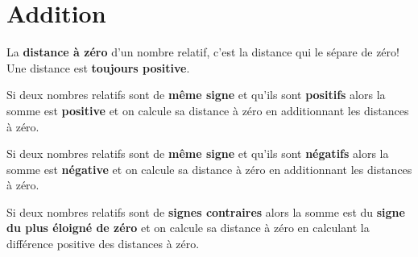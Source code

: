 \section{Addition}

\begin{definition}
    La \textbf{distance à zéro} d'un nombre relatif, c'est la distance qui le sépare de zéro!\\
    Une distance est \textbf{toujours positive}.
\end{definition}

\begin{propriete}
    Si deux nombres relatifs sont de \textbf{même signe} et qu'ils sont \textbf{positifs} alors la somme est \textbf{positive} et on calcule sa distance à zéro en additionnant les distances à zéro.
\end{propriete}

\begin{propriete}
    Si deux nombres relatifs sont de \textbf{même signe} et qu'ils sont \textbf{négatifs} alors la somme est \textbf{négative} et on calcule sa distance à zéro en additionnant les distances à zéro.
\end{propriete}

\begin{propriete}
    Si deux nombres relatifs sont de \textbf{signes contraires} alors la somme est du \textbf{signe du plus éloigné de zéro} et on calcule sa distance à zéro en calculant la différence positive des distances à zéro.
\end{propriete}

